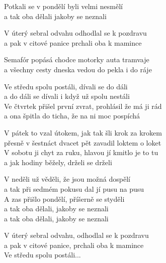 
\ve{}
Potkali se v pondělí  \quad {} \quad byli velmi nesmělí  \quad {}\\
a tak oba dělali  \quad {} \quad {}jakoby se neznali  \quad {}
 
V úterý sebral odvahu odhodlal se k pozdravu\\
a pak v citové panice prchali oba k mamince 

\cho{}
Semafór popásá chodce motorky auta tramvaje\\
a všechny cesty dneska vedou do pekla i do ráje 

\ve{}
Ve středu spolu postáli, dívali se do dáli\\
a do dáli se dívali i když už spolu nestáli\\
Ve čtvrtek přišel první zvrat, prohlásil že má ji rád\\
a ona špitla do ticha, že na ni moc pospíchá 

\cho{}

\ve{}
V pátek to vzal útokem, jak tak šli krok za krokem\\
přesně v šestnáct dvacet pět zavadil loktem o loket\\
V sobotu ji chyt za ruku, hlavou jí kmitlo je to tu\\
a jak hodiny běžely, drželi se drželi 
 
\cho{}

\ve{}
V neděli už věděli, že jsou možná dospělí\\
a tak při sedmém pokusu dal jí pusu na pusu\\
A zas přišlo pondělí, příšerně se styděli\\
a tak oba dělali, jakoby se neznali\\
a tak oba dělali, jakoby se neznali

\ve{}
V úterý sebral odvahu, odhodlal se k pozdravu\\
a pak v citové panice, prchali oba k mamince\\
Ve středu spolu postáli...

\esong 